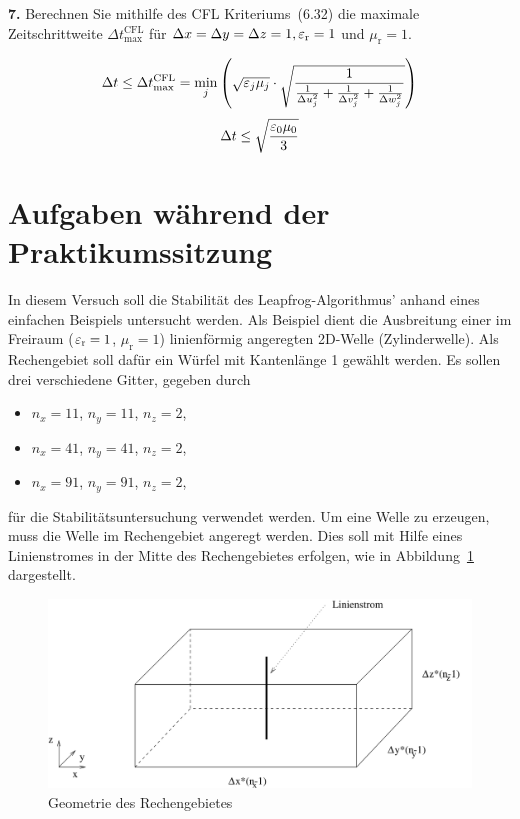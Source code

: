 \documentclass[Protokollheft.tex]{subfiles}
\begin{document}
\begin{framed}
	\noindent \textbf{7.} Berechnen Sie mithilfe des CFL Kriteriums~(6.32) die maximale
    Zeitschrittweite $\Delta t_{\text{max}}^{\text{CFL}}$ für $\Delta x=\Delta
    y=\Delta z=1, \varepsilon_\text{r}=1$ und $\mu_\text{r}=1$.\label{exer:deltaTmaxCFL}
\end{framed}

$$\Delta t \leq \Delta t_{\text{max}}^{\text{CFL}} = \min_j\left(\sqrt{\varepsilon_j \mu_j}\cdot \sqrt{\frac{1}{\frac{1}{\Delta u^2_j}+ \frac{1}{\Delta v^2_j}+\frac{1}{\Delta w^2_j}   }}     \right)$$
$$\Delta t \leq \sqrt{\frac{\varepsilon_0\mu_0}{3}} $$

\section{Aufgaben während der Praktikumssitzung}
In diesem Versuch soll die Stabilität des Leapfrog-Algorithmus' anhand eines einfachen Beispiels untersucht werden.
Als Beispiel dient die Ausbreitung einer im Freiraum ($\varepsilon_\text{r}=1$, $\mu_\text{r}=1$) linienförmig angeregten 2D-Welle (Zylinderwelle). Als Rechengebiet soll dafür ein Würfel mit Kantenlänge 1 gewählt werden. Es sollen drei verschiedene Gitter, gegeben durch
\begin{itemize}
    \item $n_x=11$, $n_y=11$, $n_z=2$,
    \item $n_x=41$, $n_y=41$, $n_z=2$,
    \item $n_x=91$, $n_y=91$, $n_z=2$,
\end{itemize}
für die Stabilitätsuntersuchung verwendet werden. Um eine Welle zu erzeugen, muss die Welle im Rechengebiet angeregt werden. Dies soll mit Hilfe eines
Linienstromes in der Mitte des Rechengebietes erfolgen, wie in
Abbildung~\ref{fig:anregung} dargestellt.\\

\begin{figure}[h]
    \centering
    \includegraphics[scale=0.7]{v6_praktskizze.pdf}
    \caption{Geometrie des Rechengebietes}\label{fig:anregung}
\end{figure}
\end{document}
